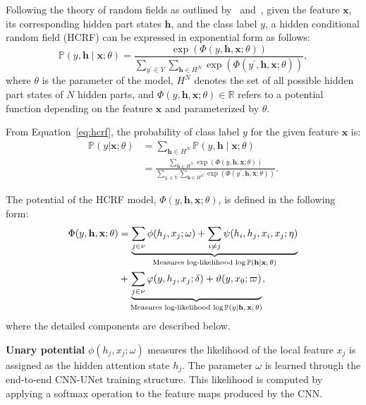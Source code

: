 \documentclass[conference]{IEEEtran}
\newcommand{\hb}{\mathbf{h}}
\newcommand{\PP}{{\mathbb{P}}}
\newcommand{\xb}{\mathbf{x}}
\newcommand{\RR}{{\mathbb{R}}}
\begin{document}
Following the theory of random fields as outlined
by~\citet{quattoni2004conditional} and~\citet{wang2006hidden},
given the feature $\xb$, its corresponding hidden part states $\hb$,
and the class label $y$, a hidden conditional random field (HCRF) can be
expressed in exponential form as follows:
\begin{equation}
\label{eq:hcrf}
\PP(y, \hb \mid \xb; \theta)
= \frac{\exp\left(\Phi(y, \hb, \xb; \theta)\right)}
{\sum_{y^\prime \in Y} \sum_{\hb \in H^N}
\exp\left(\Phi(y^\prime, \hb, \xb; \theta)\right)},
\end{equation}
where $\theta$ is the parameter of the model,
$H^N$ denotes the set of all possible hidden part states of $N$ hidden parts,
and $\Phi(y, \hb, \xb; \theta) \in \RR$ refers to a potential function
depending on the feature $\xb$ and parameterized by $\theta$.


From Equation~\ref{eq:hcrf}, the probability of class label $y$ for the given
feature $\xb$ is:
\begin{equation*}
\begin{split}
\PP(y \vert \xb; \theta) &= \sum_{\hb \in H^N} \PP(y, \hb \mid \xb; \theta) \\
&= \frac{\sum_{\hb \in H^N} \exp\left(\Phi(y, \hb, \xb; \theta)\right)}
{\sum_{y^\prime \in Y} \sum_{\hb \in H^N}
\exp\left(\Phi(y^\prime, \hb, \xb; \theta)\right)}.
\end{split}
\end{equation*}


The potential of the HCRF model, $\Phi(y, \hb, \xb; \theta)$, is defined in the
following form:
\begin{align*}
\Phi(y, \hb, \xb; \theta) &= \underbrace{
\sum_{j \in \nu} \phi(h_j, x_j; \omega) +
\sum_{i \neq j} \psi(h_i, h_j, x_i, x_j; \eta)}_{
\textrm{Measures log-likelihood $\log \PP(\hb \vert \xb; \theta)$}} \\
& + \underbrace{
\sum_{j \in \nu} \varphi(y, h_j, x_j; \delta) + \vartheta(y, x_0; \varpi)}_{
\textrm{Measures log-likelihood $\log \PP(y \vert \hb, \xb; \theta)$}},
\end{align*}
where the detailed components are described below.


\textbf{Unary potential} $\phi(h_j, x_j; \omega)$ measures the likelihood of
the local feature $x_j$ is assigned as the hidden attention state $h_j$.
The parameter $\omega$ is learned through the end-to-end CNN-UNet training
structure. This likelihood is computed by applying a softmax operation to the
feature maps produced by the CNN.
\end{document}
